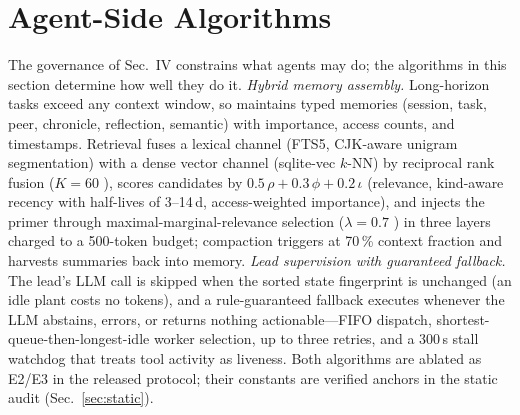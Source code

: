 \section{Agent-Side Algorithms}
The governance of Sec.~IV constrains what agents may do; the algorithms in this section determine how well they do it. \emph{Hybrid memory assembly.} Long-horizon tasks exceed any context window, so \system{} maintains typed memories (session, task, peer, chronicle, reflection, semantic) with importance, access counts, and timestamps. Retrieval fuses a lexical channel (FTS5, CJK-aware unigram segmentation) with a dense vector channel (sqlite-vec $k$-NN) by reciprocal rank fusion ($K{=}60$ \cite{cormack2009rrf}), scores candidates by $0.5\,\rho + 0.3\,\phi + 0.2\,\iota$ (relevance, kind-aware recency with half-lives of 3--14\,d, access-weighted importance), and injects the primer through maximal-marginal-relevance selection ($\lambda{=}0.7$ \cite{carbonell1998mmr}) in three layers charged to a 500-token budget; compaction triggers at 70\,\% context fraction and harvests summaries back into memory. \emph{Lead supervision with guaranteed fallback.} The lead's LLM call is skipped when the sorted state fingerprint is unchanged (an idle plant costs no tokens), and a rule-guaranteed fallback executes whenever the LLM abstains, errors, or returns nothing actionable---FIFO dispatch, shortest-queue-then-longest-idle worker selection, up to three retries, and a 300\,s stall watchdog that treats tool activity as liveness. Both algorithms are ablated as E2/E3 in the released protocol; their constants are verified anchors in the static audit (Sec.~\ref{sec:static}).
